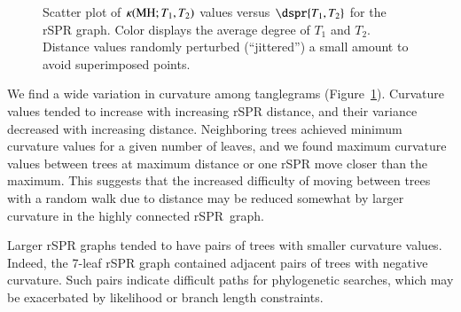 \documentclass[]{elsarticle}
\let\MYoriglatexcaption\caption
\renewcommand{\caption}[2][\relax]{\MYoriglatexcaption[#2]{#2}}
\newcommand{\MH}{\operatorname{MH}}
\newcommand{\curvature}[2][]{%
    \ifthenelse{\equal{#1}{}}%
		{\kappa(#2)}%
		{\kappa_{#1}(#2)}%
}
\begin{document}
\begin{figure}
    \caption{Scatter plot of $\curvature{\MH; T_1,T_2}$ values versus $\dspr{T_1,T_2}$ for the rSPR graph. Color displays the average degree of $T_1$ and $T_2$. Distance values randomly perturbed (``jittered'') a small amount to avoid superimposed points.}
	\label{fig:rspr-scatter}
\end{figure}

We find a wide variation in curvature among tanglegrams (Figure~\ref{fig:rspr-scatter}).
Curvature values tended to increase with increasing rSPR distance, and their variance decreased with increasing distance.
Neighboring trees achieved minimum curvature values for a given number of leaves, and we found maximum curvature values between trees at maximum distance or one rSPR move closer than the maximum.
This suggests that the increased difficulty of moving between trees with a random walk due to distance may be reduced somewhat by larger curvature in the highly connected rSPR~graph.

Larger rSPR graphs tended to have pairs of trees with smaller curvature values.
Indeed, the 7-leaf rSPR graph contained adjacent pairs of trees with negative curvature.
Such pairs indicate difficult paths for phylogenetic searches, which may be exacerbated by likelihood or branch length constraints.
\end{document}
